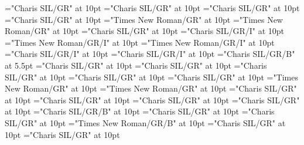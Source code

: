 \documentclass[a4paper,twoside]{article}
\begin{document}
\font\spanenetymologyentryletDatadicBody="Charis SIL/GR" at 10pt
\font\etymologyformenetymologyentryletDatadicBody="Charis SIL/GR" at 10pt
\font\spanenetymologyformenetymologyentryletDatadicBody="Charis SIL/GR" at 10pt
\font\translationsexamplessensesensesentryletDatadicBody="Charis SIL/GR" at 10pt
\font\translationpttranslationsexamplessensesensesentryletDatadicBody="Times New Roman/GR" at 10pt
\font\spanpttranslationpttranslationsexamplessensesensesentryletDatadicBody="Times New Roman/GR" at 10pt
\font\spanentranslationpttranslationsexamplessensesensesentryletDatadicBody="Charis SIL/GR" at 10pt
\font\grammaticalinfosensesentryletDatadicBody="Charis SIL/GR/I" at 10pt
\font\partofspeechptgrammaticalinfosensesentryletDatadicBody="Times New Roman/GR/I" at 10pt
\font\spanptpartofspeechptgrammaticalinfosensesentryletDatadicBody="Times New Roman/GR/I" at 10pt
\font\spanenpartofspeechptgrammaticalinfosensesentryletDatadicBody="Charis SIL/GR/I" at 10pt
\font\spanengrammaticalinfosensesentryletDatadicBody="Charis SIL/GR/I" at 10pt
\font\xhomographnumberheadwordsehentryletDatadicBody="Charis SIL/GR/B" at 5.5pt
\font{}="Charis SIL/GR" at 10pt
\font\spanendefinitionLcensensesensesentryletDatadicBody="Charis SIL/GR" at 10pt
\font\primaryrefsentryletDatadicBody="Charis SIL/GR" at 10pt
\font\spanenprimaryrefsentryletDatadicBody="Charis SIL/GR" at 10pt
\font\entryreftypeprimaryrefsentryletDatadicBody="Charis SIL/GR" at 10pt
\font\LexEntryTypepublishStemEntryTypeAbbreviationPubptentryreftypeprimaryrefsentryletDatadicBody="Times New Roman/GR" at 10pt
\font\spanptLexEntryTypepublishStemEntryTypeAbbreviationPubptentryreftypeprimaryrefsentryletDatadicBody="Times New Roman/GR" at 10pt
\font\spanenLexEntryTypepublishStemEntryTypeAbbreviationPubptentryreftypeprimaryrefsentryletDatadicBody="Charis SIL/GR" at 10pt
\font\spanenentryreftypeprimaryrefsentryletDatadicBody="Charis SIL/GR" at 10pt
\font\entryrefcomponentprimaryrefsentryletDatadicBody="Charis SIL/GR" at 10pt
\font\aentryrefcomponentprimaryrefsentryletDatadicBody="Charis SIL/GR" at 10pt
\font\LexEntrypublishStemComponentTargetHeadWordRefsehaentryrefcomponentprimaryrefsentryletDatadicBody="Charis SIL/GR/B" at 10pt
\font\subsensessensesensesentryletDatadicBody="Charis SIL/GR" at 10pt
\font\sensesubsensessensesensesentryletDatadicBody="Charis SIL/GR" at 10pt
\font\boldxsensenumbersensesubsensessensesensesentryletDatadicBody="Times New Roman/GR/B" at 10pt
\font{}="Charis SIL/GR" at 10pt
\font\spanendefinitionLcensensesubsensessensesensesentryletDatadicBody="Charis SIL/GR" at 10pt
\end{document}
